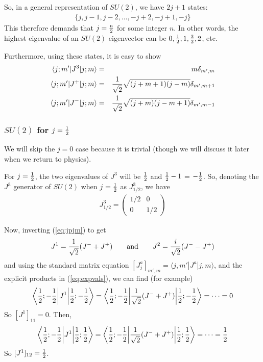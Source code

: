 \documentclass[12pt,epsf]{article}
\def\nolabel{\nonumber }
\def\nolabel{\nonumber }
\begin{document}
So, in a general representation of $SU(2)$, we have $2j+1$ states: 
\begin{eqnarray}
\{j,j-1,j-2,\ldots, -j+2,-j+1,-j\} \nolabel 
\end{eqnarray}
This therefore demands that $j={n\over 2}$ for some integer $n$.  In
other words, the highest eigenvalue of an $SU(2)$ eigenvector can be
$0,{1\over 2},1,{3\over 2},2$, etc.  

Furthermore, using these states, it is easy to show
\begin{eqnarray}
\langle j;m'|J^3|j;m\rangle &=& m\delta_{m',m} \nolabel \\
\langle j;m'|J^+|j;m\rangle &=& {1\over \sqrt{2}} \sqrt{(j+m+1)(j-m)}
\delta_{m',m+1} \nolabel \\
\langle j;m'|J^-|j;m\rangle &=& {1\over \sqrt{2}} \sqrt{(j+m)(j-m+1)}
\delta_{m',m-1} \label{eq:expvals}
\end{eqnarray}

\subsubsection{$SU(2)$ for $j={1\over 2}$}

We will skip the $j=0$ case because it is trivial (though we will
discuss it later when we return to physics).  

For $j={1\over 2}$, the two eigenvalues of $J^3$ will be ${1\over 2}$
and ${1\over 2}-1$ = $-{1\over 2}$.  So, denoting the $J^3$ generator of
$SU(2)$ when $j={1\over 2}$ as $J^3_{1/2}$, we have 
\begin{eqnarray}
J^3_{1/2} = 
\begin{pmatrix}
1/2 & 0 \\ 0 & 1/2
\end{pmatrix}\nolabel 
\end{eqnarray}

Now, inverting (\ref{eq:jpjm}) to get 
\begin{eqnarray}
J^1 = {1\over \sqrt{2}}(J^-+J^+) \qquad \mbox{and} \qquad J^2 = {i \over
\sqrt{2}}(J^--J^+) \nolabel
\end{eqnarray}
and using the standard matrix equation $[J^a_j]_{m',m} = \langle
j,m'|J^a|j,m\rangle$, and the explicit products in (\ref{eq:expvals}),
we can find (for example)
\begin{eqnarray}
\bigg\langle {1\over 2};-{1\over 2}\bigg|J^1\bigg|{1\over 2};-{1\over
2}\bigg\rangle = \bigg\langle {1\over 2};-{1\over 2}\bigg|{1\over
\sqrt{2}}(J^-+J^+)\bigg|{1\over 2};-{1\over 2}\bigg\rangle = \cdots =0
\nolabel
\end{eqnarray}
So $[J^1]_{11} = 0$.  
Then, 
\begin{eqnarray}
\bigg\langle {1\over 2};-{1\over 2}\bigg|J^1\bigg|{1\over 2};{1\over
2}\bigg\rangle = \bigg\langle {1\over 2};-{1\over 2}\bigg|{1\over
\sqrt{2}}(J^-+J^+)\bigg|{1\over 2};{1\over 2}\bigg\rangle = \cdots
={1\over 2}\nolabel
\end{eqnarray}
So $[J^1]_{12} = {1\over 2}$.  
\end{document}
